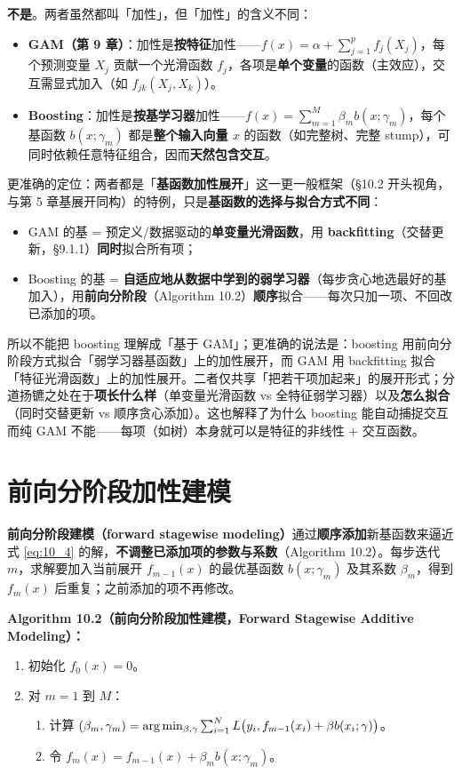 \textbf{不是}。两者虽然都叫「加性」，但「加性」的含义不同：
\begin{itemize}
    \item \textbf{GAM（第 9 章）}：加性是\textbf{按特征}加性——$f(x) = \alpha + \sum_{j=1}^{p} f_j(X_j)$，每个预测变量 $X_j$ 贡献一个光滑函数 $f_j$，各项是\textbf{单个变量}的函数（主效应），交互需显式加入（如 $f_{jk}(X_j, X_k)$）。
    \item \textbf{Boosting}：加性是\textbf{按基学习器}加性——$f(x) = \sum_{m=1}^{M} \beta_m b(x; \gamma_m)$，每个基函数 $b(x; \gamma_m)$ 都是\textbf{整个输入向量 $x$} 的函数（如完整树、完整 stump），可同时依赖任意特征组合，因而\textbf{天然包含交互}。
\end{itemize}
更准确的定位：两者都是「\textbf{基函数加性展开}」这一更一般框架（§10.2 开头视角，与第 5 章基展开同构）的特例，只是\textbf{基函数的选择与拟合方式不同}：
\begin{itemize}
    \item GAM 的基 = 预定义/数据驱动的\textbf{单变量光滑函数}，用 \textbf{backfitting}（交替更新，§9.1.1）\textbf{同时}拟合所有项；
    \item Boosting 的基 = \textbf{自适应地从数据中学到的弱学习器}（每步贪心地选最好的基加入），用\textbf{前向分阶段}（Algorithm 10.2）\textbf{顺序}拟合——每次只加一项、不回改已添加的项。
\end{itemize}
所以不能把 boosting 理解成「基于 GAM」；更准确的说法是：boosting 用前向分阶段方式拟合「弱学习器基函数」上的加性展开，而 GAM 用 backfitting 拟合「特征光滑函数」上的加性展开。二者仅共享「把若干项加起来」的展开形式；分道扬镳之处在于\textbf{项长什么样}（单变量光滑函数 vs 全特征弱学习器）以及\textbf{怎么拟合}（同时交替更新 vs 顺序贪心添加）。这也解释了为什么 boosting 能自动捕捉交互而纯 GAM 不能——每项（如树）本身就可以是特征的非线性 + 交互函数。

\section{前向分阶段加性建模}

\textbf{前向分阶段建模（forward stagewise modeling）}通过\textbf{顺序添加}新基函数来逼近式 \eqref{eq:10_4} 的解，\textbf{不调整已添加项的参数与系数}（Algorithm 10.2）。每步迭代 $m$，求解要加入当前展开 $f_{m-1}(x)$ 的最优基函数 $b(x; \gamma_m)$ 及其系数 $\beta_m$，得到 $f_m(x)$ 后重复；之前添加的项不再修改。

\textbf{Algorithm 10.2（前向分阶段加性建模，Forward Stagewise Additive Modeling）：}
\begin{enumerate}
    \item 初始化 $f_0(x) = 0$。
    \item 对 $m = 1$ 到 $M$：
    \begin{enumerate}
        \item 计算 $(\beta_m, \gamma_m) = \arg\min_{\beta, \gamma} \sum_{i=1}^{N} L\bigl(y_i, f_{m-1}(x_i) + \beta b(x_i; \gamma)\bigr)$。
        \item 令 $f_m(x) = f_{m-1}(x) + \beta_m b(x; \gamma_m)$。
    \end{enumerate}
\end{enumerate}

